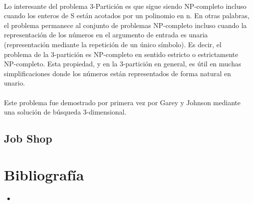 \documentclass[11pt, a4paper,spanish]{article}
\begin{document}
				\paragraph{}
				Lo interesante del problema 3-Partición es que sigue siendo NP-completo incluso cuando los enteros de S están acotados por un polinomio en n. En otras palabras, el problema permanece al conjunto de problemas NP-completo incluso cuando la representación de los números en el argumento de entrada es unaria (representación mediante la repetición de un único símbolo). Es decir, el problema de la 3-partición es NP-completo en sentido estricto o estrictamente NP-completo. Esta propiedad, y en la 3-partición en general, es útil en muchas simplificaciones donde los números están representados de forma natural en unario.
	
				\paragraph{}
				Este problema fue demostrado por primera vez por Garey y Johnson mediante una solución de búsqueda 3-dimensional.
				
			
			
			\subsection{Job Shop}

	
	\newpage

		\section{Bibliografía}

			\begin{itemize}
			
				\item
		
			\end{itemize}
\end{document}
